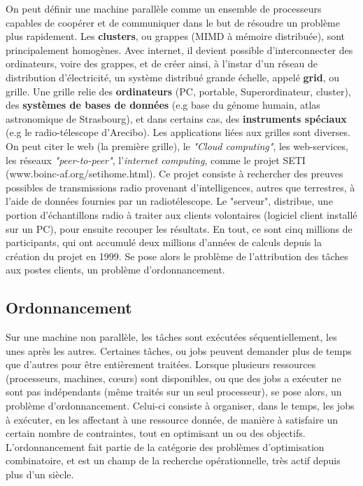 \documentclass[a4paper,12pt]{report}
\theoremstyle{plain}				%
\theoremstyle{definition}				%
\begin{document}
On peut définir une machine parallèle comme un ensemble de processeurs
capables de coopérer et de communiquer dans le but de résoudre un
problème plus rapidement.
Les \textbf{clusters}, ou grappes (MIMD à mémoire distribuée), sont
principalement homogènes.
Avec internet, il devient possible d'interconnecter des ordinateurs,
voire des grappes, et de créer ainsi, à l'instar d'un réseau de
distribution d'électricité, un système distribué grande échelle,
appelé \textbf{grid}, ou grille.
Une grille relie des \textbf{ordinateurs} (PC, portable,
Superordinateur, cluster), des \textbf{systèmes de bases de données}
(e.g base du génome humain, atlas astronomique de Strasbourg), et dans
certains cas, des \textbf{instruments spéciaux} (e.g le
radio-télescope d'Arecibo).
Les applications liées aux grilles sont diverses.
On peut citer le web (la première grille), le \textit{"Cloud
  computing"}, les web-services, les réseaux \textit{"peer-to-peer"},
l'\textit{internet computing}, comme le projet SETI
(www.boinc-af.org/setihome.html).
Ce projet consiste à rechercher des preuves possibles de transmissions
radio provenant d'intelligences, autres que terrestres, à l'aide de
données fournies par un radiotélescope.
Le "serveur", distribue, une portion d'échantillons radio à traiter
aux clients volontaires (logiciel client installé sur un PC), pour
ensuite recouper les résultats.
En tout, ce sont cinq millions de participants, qui ont accumulé deux
millions d'années de calculs depuis la création du projet en 1999.
Se pose alors le problème de l'attribution des tâches aux postes
clients, un problème d'ordonnancement.


\subsection{Ordonnancement}

Sur une machine non parallèle, les tâches sont exécutées
séquentiellement, les unes après les autres.
Certaines tâches, ou jobs peuvent demander plus de temps que d'autres
pour être entièrement traitées.
Lorsque plusieurs ressources (processeurs, machines, c\oe{}urs) sont
disponibles, ou que des jobs a exécuter ne sont pas indépendants (même
traités sur un seul processeur), se pose alors, un problème
d'ordonnancement.
Celui-ci consiste à organiser, dans le temps, les jobs à exécuter, en
les affectant à une ressource donnée, de manière à satisfaire un
certain nombre de contraintes, tout en optimisant un ou des objectifs.
L'ordonnancement fait partie de la catégorie des problèmes
d'optimisation combinatoire, et est un champ de la recherche
opérationnelle, très actif depuis plus d'un siècle.
\end{document}
